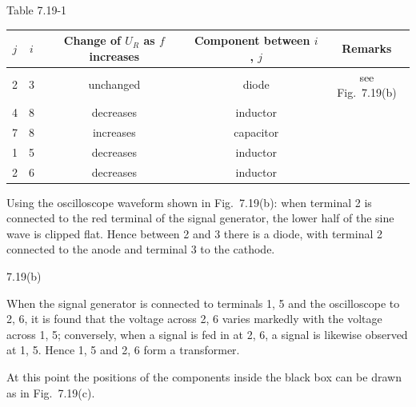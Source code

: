 \begin{center}
{\small Table 7.19-1}\\[2pt]
\begin{tabular}{ccccc}
\toprule
$j$ & $i$ & Change of $U_R$ as $f$ increases & Component between $i$, $j$ & Remarks\\
\midrule
2 & 3 & unchanged & diode & see Fig.~7.19(b)\\
4 & 8 & decreases & inductor & \\
7 & 8 & increases & capacitor & \\
1 & 5 & decreases & inductor & \\
2 & 6 & decreases & inductor & \\
\bottomrule
\end{tabular}
\end{center}

Using the oscilloscope waveform shown in Fig.~7.19(b): when terminal 2 is connected to the red terminal of the signal generator, the lower half of the sine wave is clipped flat. Hence between 2 and 3 there is a diode, with terminal 2 connected to the anode and terminal 3 to the cathode.

\begin{figbox}{7.19(b)}
\end{figbox}

When the signal generator is connected to terminals 1, 5 and the oscilloscope to 2, 6, it is found that the voltage across 2, 6 varies markedly with the voltage across 1, 5; conversely, when a signal is fed in at 2, 6, a signal is likewise observed at 1, 5. Hence 1, 5 and 2, 6 form a transformer.

At this point the positions of the components inside the black box can be drawn as in Fig.~7.19(c).

